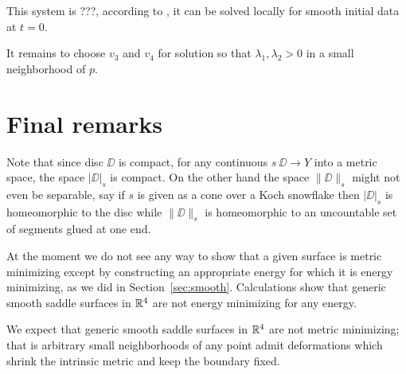 \documentclass[a4paper,10pt]{amsart}
\begin{document}
This system is ???,
according to \cite[Theorem 3.6]{bressan}, it can be solved locally for smooth initial data at $t=0$.

It remains to choose $v_3$ and $v_4$ for solution so that $\lambda_1, \lambda_2>0$ in a small neighborhood of $p$.
\qeds


\section{Final remarks}

Note that since disc $\DD$ is compact, 
for any continuous $s\:\DD\to Y$ into a metric space,
the space $|\DD|_s$ is compact.
On the other hand the space $\|\DD\|_s$ might not even be separable,
say if $s$ is given as a cone over a Koch snowflake then 
$|\DD|_s$ is homeomorphic to the disc while $\|\DD\|_s$ is homeomorphic to an uncountable set of segments glued at one end.



At the moment we do not see any way to show that a given surface is metric minimizing except by constructing an appropriate energy for which it is energy minimizing, as we did in Section~\ref{sec:smooth}.
Calculations show that generic smooth saddle surfaces in $\mathbb{R}^4$ are not energy minimizing for any energy.

We expect that generic smooth saddle surfaces in $\mathbb{R}^4$ are not metric minimizing; that is arbitrary small neighborhoods of any point admit deformations which shrink 
the intrinsic metric and keep the boundary fixed.
\end{document}
